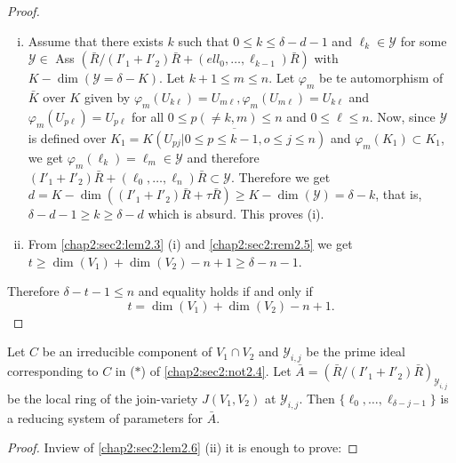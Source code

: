 \begin{proof}%
  \begin{enumerate}[(i)]
  \item Assume that there exists $k$ such that $0 \le k \le \delta-d-1$
    and $\ell_k \in  \mathscr{Y}$ for some $\mathscr{Y}
    \in $ Ass $(\bar{R}/(I'_1+I'_2) \bar{R} +
    (ell_0, \ldots,  \ell_{k-1}) \bar{R})$ with $K-\dim (\mathscr{Y}=
    \delta -K)$. Let $k+1 \leq m \leq n$. Let $\varphi_m$ be te
    automorphism of $\bar{K}$ over $K$ given
    by $\varphi_m(U_{k\ell}) = U_{m \ell}, \varphi_{m} (U_{m \ell}) =
    U_{k \ell}$ and $\varphi_m (U_{p \ell}) = U_{p \ell}$ for all $0 \le
    p(\neq k, m) \le n $ and $0 \le \ell \le n$. Now, since
    $\mathscr{Y}$ is defined over $K_1 = \overline{K(U_{pj} | 0 \le p
      \le k-1, o \le j \le n)}$ and $\varphi_m (K_1) \subset K_1$, we
    get $\varphi_m (\ell_k) = \ell_m \in  \mathscr{Y}$ and
    therefore $(I'_1+I'_2) \bar{R}+ (\ell_0, \ldots,  \ell_n) \bar{R}
    \subset \mathscr{Y}$. Therefore we get $d=K-\dim ((I'_1+I'_2) \bar{R}
    + \tau \bar{R}) \ge K-\dim (\mathscr{Y}) = \delta-k$, that is,
    $\delta-d-1 \ge k \ge \delta - d$ which is absurd. This proves
    (i). 
  \item From \ref{chap2:sec2:lem2.3} (i) and \ref{chap2:sec2:rem2.5}
    we get $t \ge \dim (V_1) + \dim (V_2)-n + 1 \ge \delta-n-1$. 
  \end{enumerate}
  
  Therefore $\delta-t-1 \le n$ and equality holds if and only if
  $$
  t = \dim (V_1) + \dim (V_2) - n + 1.
  $$
\end{proof}

\begin{proposition}\label{chap2:sec2:prop2.8}
  Let $C$ be an irreducible component of $V_1 \cap V_2$ and
  $\mathscr{Y}_{i, j} $ be the prime ideal corresponding to $C$ in ($*$)
  of \ref{chap2:sec2:not2.4}. Let $\bar{A}= (\bar{R}/(I'_1+I'_2)
  \bar{R})_{\mathscr{Y}_{i, j}}$ be the local ring of the join-variety
  $J(V_1, V_2)$ at $\mathscr{Y}_{i, j}$. Then $\{ \ell_0, \ldots,
  \ell_{\delta-j-1} \}$  is a reducing system of parameters for
  $\bar{A}$. 
\end{proposition}

\begin{proof}
  In\pageoriginale view of \ref{chap2:sec2:lem2.6} (ii) it is enough
  to prove:  
\end{proof}

